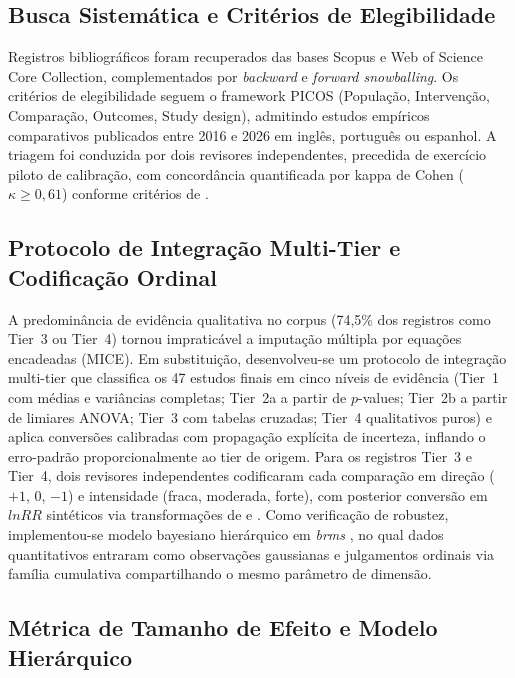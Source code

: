 \subsection{Busca Sistemática e Critérios de Elegibilidade}

Registros bibliográficos foram recuperados das bases Scopus e Web of Science Core Collection, complementados por \textit{backward} e \textit{forward snowballing}. Os critérios de elegibilidade seguem o framework PICOS (População, Intervenção, Comparação, Outcomes, Study design), admitindo estudos empíricos comparativos publicados entre 2016 e 2026 em inglês, português ou espanhol. A triagem foi conduzida por dois revisores independentes, precedida de exercício piloto de calibração, com concordância quantificada por kappa de Cohen ($\kappa \geq 0{,}61$) conforme critérios de \cite{Landis1977}.

\subsection{Protocolo de Integração Multi-Tier e Codificação Ordinal}

A predominância de evidência qualitativa no corpus (74,5\% dos registros como Tier~3 ou Tier~4) tornou impraticável a imputação múltipla por equações encadeadas (MICE). Em substituição, desenvolveu-se um protocolo de integração multi-tier que classifica os 47 estudos finais em cinco níveis de evidência (Tier~1 com médias e variâncias completas; Tier~2a a partir de $p$-values; Tier~2b a partir de limiares ANOVA; Tier~3 com tabelas cruzadas; Tier~4 qualitativos puros) e aplica conversões calibradas com propagação explícita de incerteza, inflando o erro-padrão proporcionalmente ao tier de origem. Para os registros Tier~3 e Tier~4, dois revisores independentes codificaram cada comparação em direção ($+1$, $0$, $-1$) e intensidade (fraca, moderada, forte), com posterior conversão em $lnRR$ sintéticos via transformações de \cite{Hasselblad1995} e \cite{Zhang1998}. Como verificação de robustez, implementou-se modelo bayesiano hierárquico em \textit{brms} \cite{Burkner2017}, no qual dados quantitativos entraram como observações gaussianas e julgamentos ordinais via família cumulativa compartilhando o mesmo parâmetro de dimensão.

\subsection{Métrica de Tamanho de Efeito e Modelo Hierárquico}

